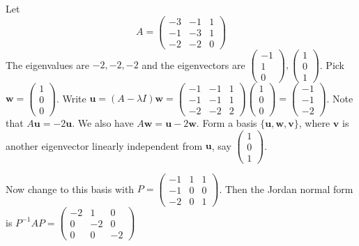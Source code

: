 \documentclass[a4paper]{article}
\begin{document}
\begin{eg}
  Let
  \[
    A = \begin{pmatrix}
      -3 & -1 & 1\\
      -1 & -3 & 1\\
      -2 & -2 & 0
    \end{pmatrix}
  \]
  The eigenvalues are $-2, -2, -2$ and the eigenvectors are $
  \begin{pmatrix}
    -1 \\1 \\ 0
  \end{pmatrix},
  \begin{pmatrix}
    1 \\ 0 \\1
  \end{pmatrix}$. Pick $\mathbf{w} =
  \begin{pmatrix}
    1\\0\\0
  \end{pmatrix}$. Write $\mathbf{u} = (A - \lambda I)\mathbf{w} =
  \begin{pmatrix}
    -1 & -1 & 1\\
    -1 & -1 & 1\\
    -2 & -2 & 2
  \end{pmatrix}
  \begin{pmatrix}
    1\\0\\0
  \end{pmatrix} =
  \begin{pmatrix}
    -1\\-1\\-2
  \end{pmatrix}$. Note that $A\mathbf{u} = -2\mathbf{u}$. We also have $A\mathbf{w} = \mathbf{u} - 2\mathbf{w}$. Form a basis $\{\mathbf{u}, \mathbf{w}, \mathbf{v}\}$, where $\mathbf{v}$ is another eigenvector linearly independent from $\mathbf{u}$, say $
  \begin{pmatrix}
    1\\0\\1
  \end{pmatrix}$.

  Now change to this basis with
  $P = \begin{pmatrix}
    -1 & 1 & 1\\
    -1 & 0 & 0\\
    -2 & 0 & 1
  \end{pmatrix}$. Then the Jordan normal form is $P^{-1}AP =
  \begin{pmatrix}
    -2 & 1 & 0\\
    0 & -2 & 0\\
    0 & 0 & -2
  \end{pmatrix}$
\end{eg}
\end{document}
